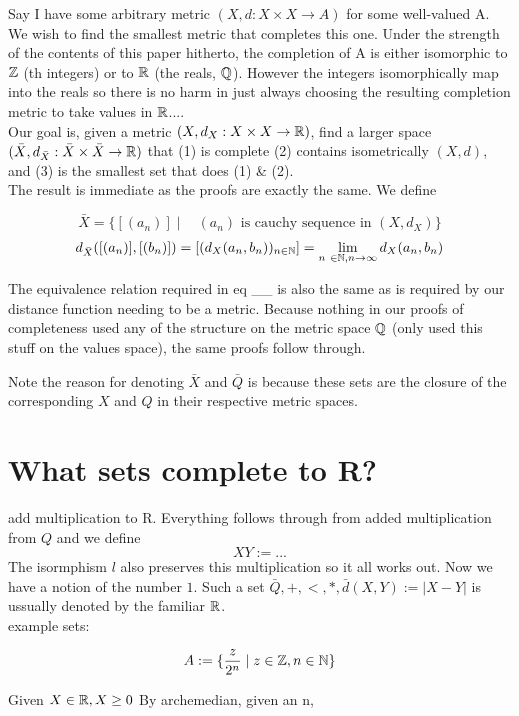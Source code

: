 Say I have some arbitrary metric $(X,d: X \times X \to A)$ for some well-valued A. We wish to find the smallest metric that completes this one. Under the strength of the contents of this paper hitherto, the completion of A is either isomorphic to $\mathbb{Z}$ (th integers) or to $\mathbb{R}$ (the reals, $\mathbb{Q}$). However the integers isomorphically map into the reals so there is no harm in just always choosing the resulting completion metric to take values in $\mathbb{R}$....\\
Our goal is, given a metric $(X,d_X: X \times X \to \mathbb{R})$, find a larger space $(\bar{X},d_{\bar{X}}:\bar{X} \times \bar{X} \to \mathbb{R})$ that (1) is complete (2) contains isometrically $(X,d)$, and (3) is the smallest set that does (1) \& (2).  \\

The result is immediate as the proofs are exactly the same. We define 

\[ \bar{X} = \{ [(a_n)] \mid\; \text{ $(a_n)$ is cauchy sequence in $(X,d_X)$}\} \]
\[ d_{\bar{X}} ([(a_n)], [(b_n)]) = [(d_X(a_n,b_n))_{n \in \mathbb{N}}] = \lim_{n \ \in \mathbb{N}, n \to \infty}d_X(a_n,b_n) \]

The equivalence relation required in eq \_\_ is also the same as is required by our distance function needing to be a metric. 
Because nothing in our proofs of completeness used any of the structure on the metric space $\mathbb{Q}$ (only used this stuff on the values space), the same proofs follow through. 

Note the reason for denoting $\bar{X}$ and $\bar{Q}$ is because these sets are the closure of the corresponding $X$ and $Q$ in their respective metric spaces. 


\section{What sets complete to R?}

add multiplication to R. Everything follows through from added multiplication from $Q$ and we define 
\[ XY := ... \]
The isormphism $l$ also preserves this multiplication so it all works out. Now we have a notion of the number $1$. Such a set $\bar{Q},+,<,*,\bar{d}(X,Y) := |X - Y| $ is ussually denoted by the familiar $\mathbb{R}$. \\

example sets: 

\[ A := \{ \frac{z}{2^n} \mid z \in \mathbb{Z}, n \in \mathbb{N} \} \]


Given $X \in \mathbb{R}, X \geq 0$ By archemedian, given an n, 

